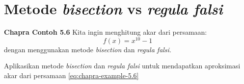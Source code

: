 \section{Metode \textit{bisection} vs \textit{regula falsi}}

\textbf{Chapra Contoh 5.6}
Kita ingin menghitung akar dari persamaan:
\begin{equation}
f(x) = x^{10} - 1
\label{eq:chapra-example-5.6}
\end{equation}
dengan menggunakan metode \textit{bisection} dan \textit{regula falsi}.

\begin{soal}
Aplikasikan metode \textit{bisection} dan \textit{regula falsi} untuk mendapatkan
aproksimasi akar dari persamaan \eqref{eq:chapra-example-5.6}
\end{soal}